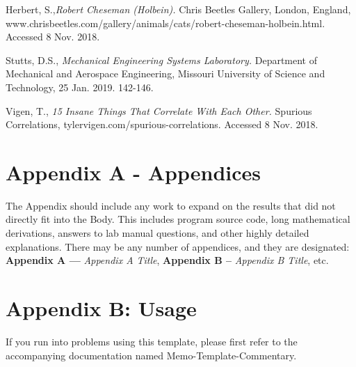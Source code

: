 \documentclass[11pt,letter]{report}
\begin{document}
\begin{thebibliography}{9}

	  Herbert, S.,\emph{Robert Cheseman (Holbein).}
	  Chris Beetles Gallery, London, England, www.chrisbeetles.com/gallery/animals/cats/robert-cheseman-holbein.html. Accessed 8 Nov. 2018.
	  
	  Stutts, D.S., \emph{Mechanical Engineering Systems Laboratory.}
	  Department of Mechanical and Aerospace Engineering, Missouri University of Science and Technology, 25 Jan. 2019. 142-146.
	  
	  Vigen, T., \emph{15 Insane Things That Correlate With Each Other.}
	  Spurious Correlations, tylervigen.com/spurious-correlations. Accessed 8 Nov. 2018.

\end{thebibliography}

\newpage %
\section*{Appendix A - \textnormal{Appendices}}
The Appendix should include any work to expand on the results that did not directly fit into the Body. This includes program source code, long mathematical derivations, answers to lab manual questions, and other highly detailed explanations. There may be any number of appendices, and they are designated: \textbf{Appendix A —} \textit{Appendix A Title}, \textbf{Appendix B –} \textit{Appendix B Title}, etc.

\newpage 
\section*{Appendix B: Usage}
If you run into problems using this template, please first refer to the accompanying documentation named Memo-Template-Commentary.
\end{document}
